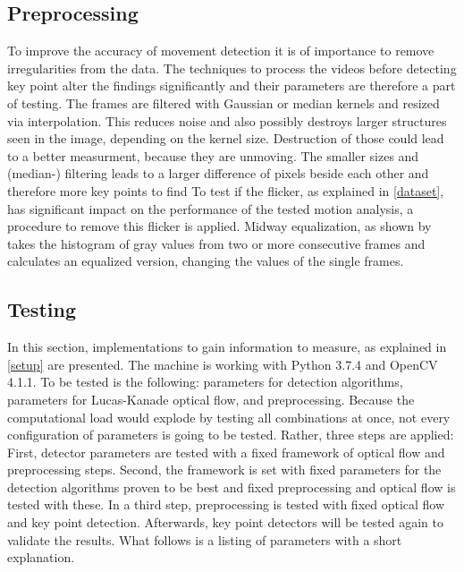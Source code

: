 \documentclass[Bachelorarbeit.tex]{subfiles}
\begin{document}
\subsection{Preprocessing}
\label{preprocessing}
To improve the accuracy of movement detection it is of importance to remove irregularities from the data. The techniques to process the videos before detecting key point alter the findings significantly and their parameters are therefore a part of testing. The frames are filtered with Gaussian or median kernels and resized via interpolation. This reduces noise and also possibly destroys larger structures seen in the image, depending on the kernel size. Destruction of those could lead to a better measurment, because they are unmoving. The smaller sizes and (median-) filtering leads to a larger difference of pixels beside each other and therefore more key points to find 
To test if the flicker, as explained in \autoref{dataset}, has significant impact on the performance of the tested motion analysis, a procedure to remove this flicker is applied. Midway equalization, as shown by \cite{delon2004midway} takes the histogram of gray values from two or more consecutive frames and calculates an equalized version, changing the values of the single frames.  

 

\subsection{Testing}
\label{testing}

In this section, implementations to gain information to measure, as explained in \autoref{setup} are presented. The machine is working with Python 3.7.4 and OpenCV 4.1.1. To be tested is the following: parameters for detection algorithms, parameters for Lucas-Kanade optical flow, and preprocessing. Because the computational load would explode by testing all combinations at once, not every configuration of parameters is going to be tested.  Rather, three steps are applied: First, detector parameters are tested with a fixed framework of optical flow and preprocessing steps. Second, the framework is set with fixed parameters for the detection algorithms proven to be best and fixed preprocessing and optical flow is tested with these. In a third step, preprocessing is tested with fixed optical flow and key point detection. Afterwards, key point detectors will be tested again to validate the results. What follows is a listing of parameters with a short explanation.
\end{document}
